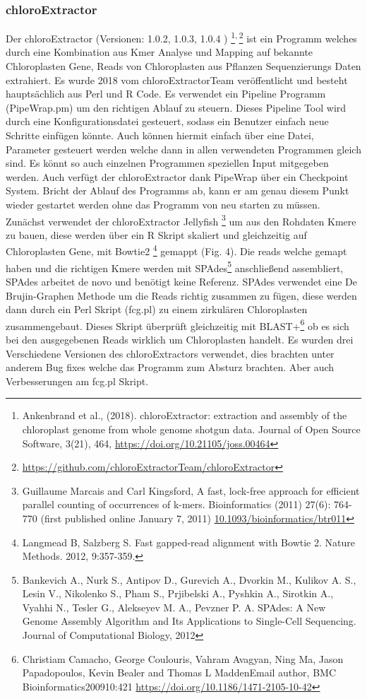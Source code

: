 \documentclass{scrartcl}
\begin{document}
\subsubsection{chloroExtractor}
\label{sec-2-5-1}
Der chloroExtractor (Versionen: 1.0.2, 1.0.3, 1.0.4 ) \footnote{Ankenbrand et al., (2018). chloroExtractor: extraction and assembly of the chloroplast genome from whole genome shotgun data. Journal of Open Source Software, 3(21), 464, \url{https://doi.org/10.21105/joss.00464}}\textsuperscript{,}\,\footnote{\url{https://github.com/chloroExtractorTeam/chloroExtractor}} ist ein Programm welches durch eine Kombination aus Kmer Analyse und Mapping auf bekannte Chloroplasten Gene, Reads von Chloroplasten aus Pflanzen Sequenzierungs Daten
extrahiert. Es wurde 2018 vom chloroExtractorTeam veröffentlicht \footnotemark[15]{} und besteht hauptsächlich aus Perl und R Code. Es verwendet ein Pipeline Programm (PipeWrap.pm) um den richtigen Ablauf zu steuern.
Dieses Pipeline Tool wird durch eine Konfigurationsdatei gesteuert, sodass ein Benutzer einfach neue Schritte einfügen könnte. Auch können hiermit einfach über eine Datei, Parameter gesteuert werden welche dann in 
allen verwendeten Programmen gleich sind. Es könnt so auch einzelnen Programmen speziellen Input mitgegeben werden. Auch verfügt der chloroExtractor dank PipeWrap über ein Checkpoint System. Bricht der Ablauf des Programms
ab, kann er am genau diesem Punkt wieder gestartet werden ohne das Programm von neu starten zu müssen. Zunächst verwendet der chloroExtractor Jellyfish \footnote{Guillaume Marcais and Carl Kingsford, A fast, lock-free approach for efficient parallel counting of occurrences of k-mers. Bioinformatics (2011) 27(6): 764-770 (first published online January 7, 2011) \url{10.1093/bioinformatics/btr011}} um aus den Rohdaten Kmere zu bauen, diese werden über ein R
Skript skaliert und gleichzeitig auf Chloroplasten Gene, mit Bowtie2 \footnote{Langmead B, Salzberg S. Fast gapped-read alignment with Bowtie 2. Nature Methods. 2012, 9:357-359.} gemappt (Fig. 4). Die reads welche gemapt haben und die richtigen Kmere werden mit SPAdes\footnote{Bankevich A., Nurk S., Antipov D., Gurevich A., Dvorkin M., Kulikov A. S., Lesin V., Nikolenko S., Pham S., Prjibelski A., Pyshkin A., Sirotkin A., Vyahhi N., Tesler G., Alekseyev M. A., Pevzner P. A. SPAdes: A New Genome Assembly Algorithm and Its Applications to Single-Cell Sequencing.        Journal of Computational Biology, 2012} anschließend assembliert, SPAdes arbeitet de novo und benötigt
keine Referenz. SPAdes verwendet eine De Brujin-Graphen Methode um die Reads richtig zusammen zu fügen, diese werden dann durch ein Perl Skript (fcg.pl) zu einem zirkulären Chloroplasten zusammengebaut. Dieses Skript überprüft
gleichzeitig mit BLAST+\footnote{Christiam Camacho, George Coulouris, Vahram Avagyan, Ning Ma, Jason Papadopoulos, Kevin Bealer and Thomas L MaddenEmail author, BMC Bioinformatics200910:421 \url{https://doi.org/10.1186/1471-2105-10-42}} ob es sich bei den ausgegebenen Reads wirklich um Chloroplasten handelt. Es wurden drei Verschiedene Versionen des chloroExtractors verwendet, dies brachten unter anderem Bug fixes welche das 
Programm zum Absturz brachten. Aber auch Verbesserungen am fcg.pl Skript.
\end{document}
